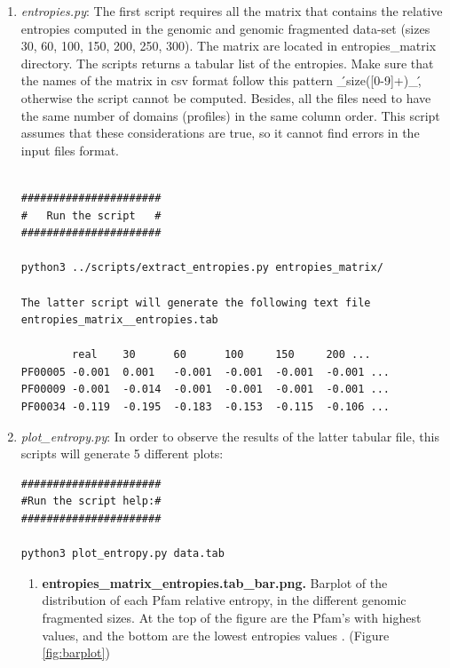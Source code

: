 \documentclass[12pt]{report}
\begin{document}
\begin{enumerate}

\item  \textit{entropies.py}: The first script requires all the matrix that
contains the relative entropies computed in the genomic and genomic 
fragmented data-set (sizes 30, 60, 100, 150, 200, 250, 
300). The matrix are located in entropies\_matrix 
directory. The scripts  returns a tabular list of the 
entropies. Make sure that the names of the matrix in csv 
format follow this pattern \'\_size([0-9]+)\_\', otherwise 
the script cannot be computed. Besides, all the files need to 
have the same number of domains (profiles) in the same column 
order. This script assumes that these considerations are true, 
so it cannot find errors in the input files format.

\begin{verbatim}

######################
#   Run the script   #
######################

python3 ../scripts/extract_entropies.py entropies_matrix/

The latter script will generate the following text file 
entropies_matrix__entropies.tab

        real    30      60      100     150     200 ...    
PF00005 -0.001  0.001   -0.001  -0.001  -0.001  -0.001 ...
PF00009 -0.001  -0.014  -0.001  -0.001  -0.001  -0.001 ...
PF00034 -0.119  -0.195  -0.183  -0.153  -0.115  -0.106 ...
\end{verbatim}

\item \textit{plot\_entropy.py}: In order to observe the results of the latter
tabular file, this scripts will generate 5 different plots:
\begin{verbatim}
######################
#Run the script help:#
######################

python3 plot_entropy.py data.tab 

\end{verbatim}

\begin{enumerate}
\item \textbf{entropies\_matrix\_entropies.tab\_bar.png.} Barplot of the
distribution of each Pfam relative entropy, in the different genomic fragmented
sizes. At the top of the figure are the  Pfam's with highest values, and the
bottom are the lowest entropies values . (Figure \ref{fig:barplot})


\end{enumerate}
\end{enumerate}
\end{document}
